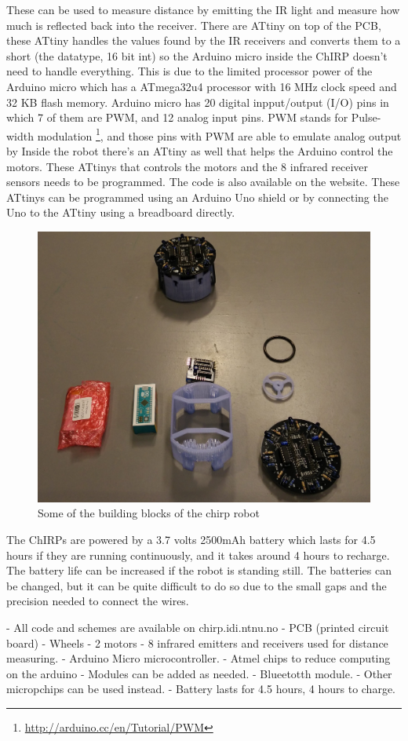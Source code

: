 These can be used to measure distance by emitting the IR light and measure how much is reflected back into the receiver. There are ATtiny on top of the PCB, these ATtiny handles the values found by the IR receivers and converts them to a short (the datatype, 16 bit int) so the Arduino micro inside the ChIRP doesn't need to handle everything. This is due to the limited processor power of the Arduino micro which has a ATmega32u4 processor with 16 MHz clock speed and 32 KB flash memory. Arduino micro has 20 digital inpput/output (I/O) pins in which 7 of them are PWM, and 12 analog input pins. PWM stands for Pulse-width modulation \footnote{\href{http://arduino.cc/en/Tutorial/PWM}{http://arduino.cc/en/Tutorial/PWM}}, and those pins with PWM are able to emulate analog output by 
Inside the robot there's an ATtiny as well that helps the Arduino control the motors. These ATtinys that controls the motors and the 8 infrared receiver sensors needs to be programmed. The code is also available on the website. These ATtinys can be programmed using an Arduino Uno shield or by connecting the Uno to the ATtiny using a breadboard directly.
\begin{figure}[H]
	\centering
	\includegraphics[width=0.8\linewidth]{images/chirpPieces}
	\caption[ChIRP pieces]{Some of the building blocks of the chirp robot}
\end{figure}


The ChIRPs are powered by a 3.7 volts 2500mAh battery which lasts for 4.5 hours if they are running continuously, and it takes around 4 hours to recharge. The battery life can be increased if the robot is standing still. The batteries can be changed, but it can be quite difficult to do so due to the small gaps and the precision needed to connect the wires.

- All code and schemes are available on chirp.idi.ntnu.no
- PCB (printed circuit board)
- Wheels
- 2 motors
- 8 infrared emitters and receivers used for distance measuring.
- Arduino Micro microcontroller.
- Atmel chips to reduce computing on the arduino
- Modules can be added as needed.
- Blueetotth module.
- Other micropchips can be used instead.
- Battery lasts for 4.5 hours, 4 hours to charge.

